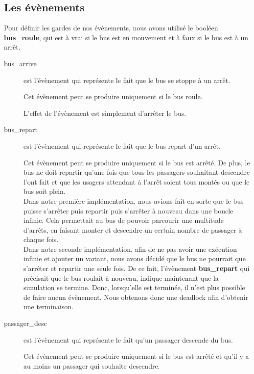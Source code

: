 \documentclass[a4paper,titlepage]{report}
\begin{document}
	\subsection{Les évènements}
		Pour définir les gardes de nos évènements, nous avons utilisé le booléen \textbf{bus\_roule}, qui est à vrai si le bus est en mouvement et à faux si le bus est à un arrêt.\\
		
		\begin{description}
			\item[bus\_arrive] est l'évènement qui représente le fait que le bus se stoppe à un arrêt.
			
			Cet évènement peut se produire uniquement si le bus roule. 
			
			L'effet de l'évènement est simplement d'arrêter le bus.\\
		
			\item[bus\_repart] est l'évènement qui représente le fait que le bus repart d'un arrêt.
			
			Cet évènement peut se produire uniquement si le bus est arrêté. De plus, le bus ne doit repartir qu'une fois que tous les passagers souhaitant descendre l'ont fait et que les usagers attendant à l'arrêt soient tous montés ou que le bus soit plein. \\
			
			Dans notre première implémentation, nous avions fait en sorte que le bus puisse s'arrêter puis repartir puis s'arrêter à nouveau dans une boucle infinie. Cela permettait au bus de pouvoir parcourir une multitude d'arrêts, en faisant monter et descendre un certain nombre de passager à chaque fois.\\
			
			Dans notre seconde implémentation, afin de ne pas avoir une exécution infinie et ajouter un variant, nous avons décidé que le bus ne pourrait que s'arrêter et repartir une seule fois. De ce fait, l'évènement \textbf{bus\_repart} qui précisait que le bus roulait à nouveau, indique maintenant que la simulation se termine. Donc, lorsqu'elle est terminée, il n'est plus possible de faire aucun évènement. Nous obtenons donc une deadlock afin d'obtenir une terminaison.
			


			\item[passager\_desc] est l'évènement qui représente le fait qu'un passager descende du bus.
			
			Cet évènement peut se produire uniquement si le bus est arrêté et qu'il y a au moins un passager qui souhaite descendre.
			

\end{description}
\end{document}
